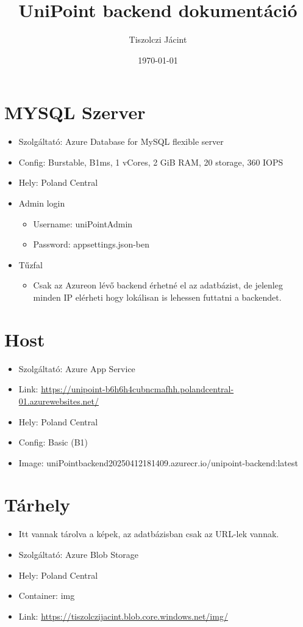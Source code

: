 \documentclass[11pt]{article}
\author{Tiszolczi Jácint}
\date{\today}
\title{UniPoint backend dokumentáció}
\begin{document}
\maketitle
\section{MYSQL Szerver}
\label{sec:org71c43ff}
\begin{itemize}
\item Szolgáltató: Azure Database for MySQL flexible server
\item Config: Burstable, B1ms, 1 vCores, 2 GiB RAM, 20 storage, 360 IOPS
\item Hely: Poland Central
\item Admin login
\begin{itemize}
\item Username: uniPointAdmin
\item Password: appsettings.json-ben
\end{itemize}
\item Tűzfal
\begin{itemize}
\item Csak az Azureon lévő backend érhetné el az adatbázist, de jelenleg minden IP elérheti hogy lokálisan is lehessen futtatni a backendet.
\end{itemize}
\end{itemize}
\section{Host}
\label{sec:org24854f9}
\begin{itemize}
\item Szolgáltató: Azure App Service
\item Link: \url{https://unipoint-b6h6h4cubncmafhh.polandcentral-01.azurewebsites.net/}
\item Hely: Poland Central
\item Config: Basic (B1)
\item Image: uniPointbackend20250412181409.azurecr.io/unipoint-backend:latest
\end{itemize}
\section{Tárhely}
\label{sec:org925176c}
\begin{itemize}
\item Itt vannak tárolva a képek, az adatbázisban csak az URL-lek vannak.
\item Szolgáltató: Azure Blob Storage
\item Hely: Poland Central
\item Container: img
\item Link: \url{https://tiszolczijacint.blob.core.windows.net/img/}
\end{itemize}
\end{document}
